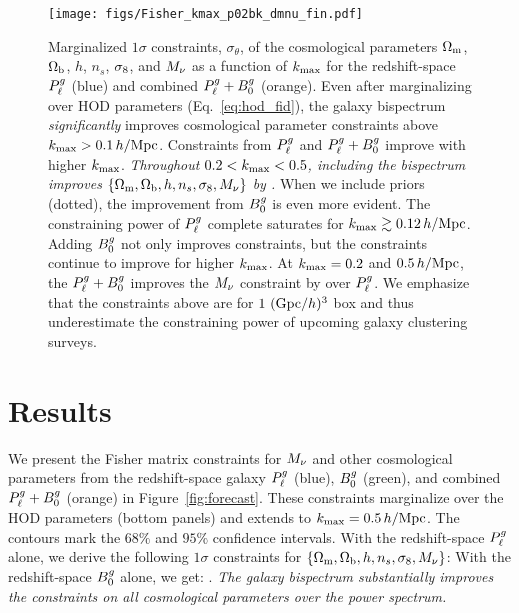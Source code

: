 \begin{figure}
    \begin{center}
        \texttt{[image: figs/Fisher\_kmax\_p02bk\_dmnu\_fin.pdf]}
        \caption{Marginalized $1\sigma$ constraints, $\sigma_\theta$, of the
        cosmological parameters $\Omega_{\rm m}$, $\Omega_{\rm b}$, $h$, $n_s$, $\sigma_8$, and $M_\nu$
        as a function of $k_{\rm max}$ for the redshift-space $P^g_{\ell}$ (blue)
        and combined $P^g_{\ell} + B^g_0$ (orange). Even after marginalizing over
        HOD parameters (Eq.~\ref{eq:hod_fid}), the galaxy bispectrum {\em
        significantly} improves cosmological parameter constraints above
        $k_{\rm max} > 0.1\,h/\mathrm{Mpc}$. Constraints from $P^g_{\ell}$ and
        $P^g_{\ell} + B^g_0$ improve with higher $k_{\rm max}$. {\em Throughout 
        $0.2 < k_{\rm max} < 0.5$, including the bispectrum improves 
        $\{\Omega_{\rm m}, \Omega_{\rm b}, h, n_s, \sigma_8, M_\nu\}$ by .} When we include 
        \planck priors (dotted), the improvement from $B^g_0$ is even more
        evident. The constraining power of $P^g_{\ell}$ complete
        saturates for $k_{\rm max} \gtrsim 0.12\,h/\mathrm{Mpc}$. Adding $B^g_0$ not only 
        improves constraints, but the constraints continue to improve for
        higher $k_{\rm max}$. At $k_{\rm max} = 0.2$ and $0.5\,h/\mathrm{Mpc}$, the $P^g_{\ell}
        + B^g_0$ improves the $M_\nu$ constraint by  over $P^g_{\ell}$. 
        We emphasize that the constraints above are for $1~({\rm Gpc}/h)^3$ box
        and thus underestimate the constraining power of upcoming galaxy
        clustering surveys.
        }
        \label{fig:kmax_forecast}
    \end{center}
\end{figure}

\section{Results} \label{sec:results} 
We present the Fisher matrix constraints for $M_\nu$ and other cosmological
parameters from the redshift-space galaxy $P^g_{\ell}$ (blue), $B^g_0$ (green), and 
combined $P^g_{\ell} + B^g_0$ (orange) in Figure~\ref{fig:forecast}. These
constraints marginalize over the \cite{zheng2007} HOD parameters %
(bottom panels) and extends to $k_{\rm max} = 0.5\,h/\mathrm{Mpc}$. The contours mark the $68\%$ and
$95\%$ confidence intervals. With the redshift-space $P^g_{\ell}$
alone, we derive the following $1\sigma$ constraints for $\{\Omega_{\rm m}, \Omega_{\rm b}, h, n_s,
\sigma_8, M_\nu\}$: 
With the redshift-space $B^g_0$ alone, we get: 
.
{\em The galaxy bispectrum substantially improves the constraints
on all cosmological parameters over the power spectrum.} 


